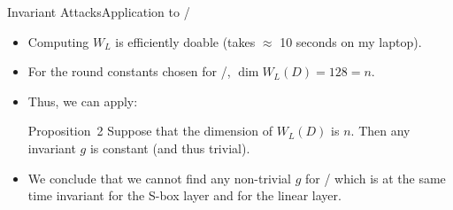 \begin{frame}{Invariant Attacks}{Application to \clyde/}
    \begin{itemize}
        \item Computing $W_L$ is efficiently doable (takes $\approx$ 10 seconds on my laptop).
        \item For the round constants chosen for \clyde/, $\dim W_L(D) = 128 = n$.
    \end{itemize}
    \begin{itemize}
        \item Thus, we can apply:
              \begin{block}{Proposition~2 \cite{C:BCLR17}}
                  Suppose that the dimension of $W_L(D)$ is $n$.
                  Then any invariant $g$ is constant (and thus trivial).
              \end{block}
    \end{itemize}
    \begin{itemize}
        \item We conclude that we cannot find any non-trivial $g$ for \clyde/ which is at the same time invariant for the S-box layer and for the linear layer.
    \end{itemize}
\end{frame}

